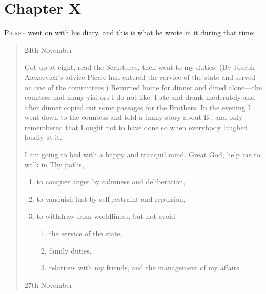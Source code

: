\chapter*{Chapter X}
\ifaudio     
{} 
\fi

\lettrine[lines=2, loversize=0.3, lraise=0]{\initfamily P}{ierre}
went on with his diary, and this is what he wrote in it
during that time:

\begin{quote} \calli

24th November

Got up at eight, read the Scriptures, then went to my duties. (By
Joseph Alexeevich's advice Pierre had entered the service of the
state and served on one of the committees.) Returned home for
dinner and dined alone---the countess had many visitors I do not
like. I ate and drank moderately and after dinner copied out some
passages for the Brothers.  In the evening I went down to the
countess and told a funny story about B., and only remembered
that I ought not to have done so when everybody laughed loudly at
it.

I am going to bed with a happy and tranquil mind. Great God, help
me to walk in Thy paths,
\begin{enumerate}
\item to conquer anger by calmness and deliberation,
\item to vanquish lust by self-restraint and repulsion,
\item to withdraw from worldliness, but not avoid
\begin{enumerate}
\item the service of the state,
\item family duties,
\item relations with my friends, and the management of my
affairs.
\end{enumerate}
\end{enumerate}

27th November


\end{quote}
